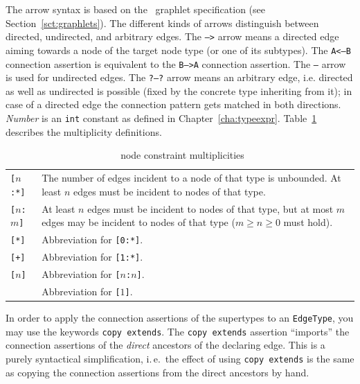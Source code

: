 The arrow syntax is based on the \GrG\ graphlet specification (see Section~\ref{sct:graphlets}).
The different kinds of arrows distinguish between directed, undirected, and arbitrary edges.
The \texttt{-->} arrow means a directed edge aiming towards a node of the target node type (or one of its subtypes).
The \texttt{A<--B} connection assertion is equivalent to the \texttt{B-->A} connection assertion.
The \texttt{--} arrow is used for undirected edges.
The \texttt{?--?} arrow means an arbitrary edge, i.e. directed as well as undirected is possible (fixed by the concrete type inheriting from it); in case of a directed edge the connection pattern gets matched in both directions.
\emph{Number} is an \texttt{int} constant as defined in Chapter~\ref{cha:typeexpr}.
Table~\ref{multiplicities} describes the multiplicity definitions.

\begin{table}[htbp]
\begin{tabularx}{\linewidth}{|l|X|}\hline
	\texttt{[$n$:*]} & The number of edges incident to a node of that type is unbounded. At least $n$ edges must be incident to nodes of that type.\\
	\texttt{[$n$:$m$]} & At least $n$ edges must be incident to nodes of that type, but at most $m$ edges may be incident to nodes of that type ($m \geq n \geq 0$ must hold).\\
	\texttt{[*]} & Abbreviation for \texttt{[0:*]}.\\
	\texttt{[+]} & Abbreviation for \texttt{[1:*]}.\\
	\texttt{[$n$]} & Abbreviation for \texttt{[$n$:$n$]}.\\
	               & Abbreviation for \texttt{[$1$]}. \\ \hline
\end{tabularx}
\caption{\GrG\ node constraint multiplicities}
\label{multiplicities}
\end{table}

In order to apply the connection assertions of the supertypes to an \texttt{EdgeType}, you may use the keywords \texttt{copy extends}.
The \texttt{copy extends} assertion ``imports'' the connection assertions of the \emph{direct} ancestors of the declaring edge.
This is a purely syntactical simplification, i.\,e.\ the effect of using \texttt{copy extends} is the same as copying the connection assertions from the direct ancestors by hand.

